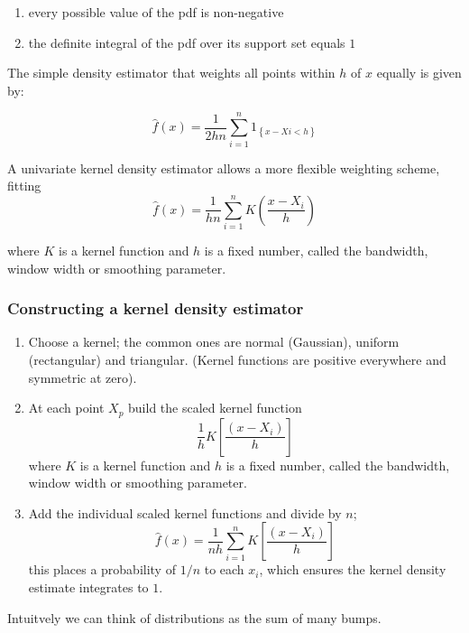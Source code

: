\documentclass[twoside]{article}
\theoremstyle{definition}
\theoremstyle{definition}
\begin{document}
\begin{enumerate}
  \item every possible value of the pdf is non-negative
  \item the definite integral of the pdf over its support set equals $1$ 
\end{enumerate}

The simple density estimator that weights all points within $h$ of $x$ equally is given by: 

\begin{equation}
\hat{f}(x) = \frac{1}{2hn} \sum^n_{i=1} 1_{\left\{x-Xi < h\right\}}
\end{equation}

A univariate kernel density estimator allows a more flexible weighting scheme, fitting 
\begin{equation}
\hat{f}(x) = \frac{1}{hn} \sum^n_{i=1} K \left( \frac{x - X_i}{h} \right)
\end{equation}

where $K$ is a kernel function and $h$ is a fixed number, called the bandwidth, window width or smoothing parameter. 

\subsubsection{Constructing a kernel density estimator}

\begin{enumerate}
  \item Choose a kernel; the common ones are normal (Gaussian), uniform (rectangular) and triangular. (Kernel functions are positive everywhere and symmetric at zero).
  \item At each point $X_p$ build the scaled kernel function 
  \begin{equation}
  \frac{1}{h}K \left[\frac{(x-X_i)}{h}\right]
  \end{equation}
  where $K$ is a kernel function and $h$ is a fixed number, called the bandwidth, window width or smoothing parameter. 
  \item Add the individual scaled kernel functions and divide by $n$;
  \begin{equation}
 \hat{f}(x) =  \frac{1}{nh}\sum^n_{i=1}K \left[\frac{(x-X_i)}{h}\right]
  \end{equation}
  this places a probability of $1/n$ to each $x_i$, which ensures the kernel density estimate integrates to $1$.
\end{enumerate}
Intuitvely we can think of distributions as the sum of many bumps.
\end{document}

